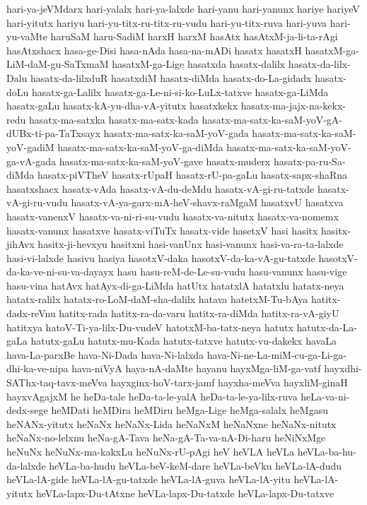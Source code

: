 {hari-ya-jeVMdarx
hari-yalalx
hari-ya-lalxde
hari-yanu
hari-yanunx
hariye
hariyeV
hari-yitutx
hariyu
hari-yu-titx-ru-titx-ru-vudu
hari-yu-titx-ruva
hari-yuva
hari-yu-vaMte
haruSaM
haru-SadiM
harxH
harxM
hasAtx
hasAtxM-ja-li-ta-rAgi
hasAtxshacx
hasa-ge-Disi
hasa-nAda
hasa-na-mADi
hasatx
hasatxH
hasatxM-ga-LiM-daM-gu-SaTxmaM
hasatxM-ga-Lige
hasatxda
hasatx-dalilx
hasatx-da-lilx-Dalu
hasatx-da-lilxduR
hasatxdiM
hasatx-diMda
hasatx-do-La-gidadx
hasatx-doLu
hasatx-ga-Lalilx
hasatx-ga-Le-ni-si-ko-LuLx-tatxve
hasatx-ga-LiMda
hasatx-gaLu
hasatx-kA-yu-dha-vA-yitutx
hasatxkekx
hasatx-ma-jajx-na-kekx-redu
hasatx-ma-satxka
hasatx-ma-satx-kada
hasatx-ma-satx-ka-saM-yoV-gA-dUBx-ti-pa-TaTxsayx
hasatx-ma-satx-ka-saM-yoV-gada
hasatx-ma-satx-ka-saM-yoV-gadiM
hasatx-ma-satx-ka-saM-yoV-ga-diMda
hasatx-ma-satx-ka-saM-yoV-ga-vA-gada
hasatx-ma-satx-ka-saM-yoV-gave
hasatx-muderx
hasatx-pa-ru-Sa-diMda
hasatx-piVTheV
hasatx-rUpaH
hasatx-rU-pa-gaLu
hasatx-sapx-shaRna
hasatxshacx
hasatx-vAda
hasatx-vA-du-deMdu
hasatx-vA-gi-ru-tatxde
hasatx-vA-gi-ru-vudu
hasatx-vA-ya-garx-mA-heV-shavx-raMgaM
hasatxvU
hasatxva
hasatx-vanenxV
hasatx-va-ni-ri-su-vudu
hasatx-va-nitutx
hasatx-va-nomemx
hasatx-vanunx
hasatxve
hasatx-viTuTx
hasatx-vide
hasetxV
hasi
hasitx
hasitx-jihAvx
hasitx-ji-hevxyu
hasitxni
hasi-vanUnx
hasi-vanunx
hasi-va-ra-ta-lalxde
hasi-vi-lalxde
hasivu
hasiya
hasotxV-daka
hasotxV-da-ka-vA-gu-tatxde
hasotxV-da-ka-ve-ni-su-va-dayayx
hasu
hasu-reM-de-Le-su-vudu
hasu-vanunx
hasu-vige
hasu-vina
hatAvx
hatAyx-di-ga-LiMda
hatUtx
hatatxlA
hatatxlu
hatatx-neya
hatatx-ralilx
hatatx-ro-LoM-daM-sha-dalilx
hatava
hatetxM-Tu-bAya
hatitx-dadx-reVnu
hatitx-rada
hatitx-ra-da-varu
hatitx-ra-diMda
hatitx-ra-vA-giyU
hatitxya
hatoV-Ti-ya-lilx-Du-vudeV
hatotxM-ba-tatx-neya
hatutx
hatutx-da-La-gaLa
hatutx-gaLu
hatutx-mu-Kada
hatutx-tatxve
hatutx-vu-dakekx
havaLa
hava-La-parxBe
hava-Ni-Dada
hava-Ni-lalxda
hava-Ni-ne-La-miM-cu-ga-Li-ga-dhi-ka-ve-nipa
hava-niVyA
haya-nA-daMte
hayanu
hayxMga-liM-ga-vatf
hayxdhi-SAThx-taq-tavx-meVva
hayxginx-hoV-tarx-jamf
hayxha-meVva
hayxliM-ginaH
hayxvAgajxM
he
heDa-tale
heDa-ta-le-yalA
heDa-ta-le-ya-lilx-ruva
heLa-va-ni-dedx-sege
heMDati
heMDira
heMDiru
heMga-Lige
heMga-salalx
heMgasu
heNANx-yitutx
heNaNx
heNaNx-Lida
heNaNxM
heNaNxne
heNaNx-nitutx
heNaNx-no-lelxnu
heNa-gA-Tava
heNa-gA-Ta-va-nA-Di-haru
heNiNxMge
heNuNx
heNuNx-ma-kakxLu
heNuNx-rU-pAgi
heV
heVLA
heVLa
heVLa-ba-hu-da-lalxde
heVLa-ba-hudu
heVLa-beV-keM-dare
heVLa-beVku
heVLa-lA-dudu
heVLa-lA-gide
heVLa-lA-gu-tatxde
heVLa-lA-guva
heVLa-lA-yitu
heVLa-lA-yitutx
heVLa-lapx-Du-tAtxne
heVLa-lapx-Du-tatxde
heVLa-lapx-Du-tatxve
}
